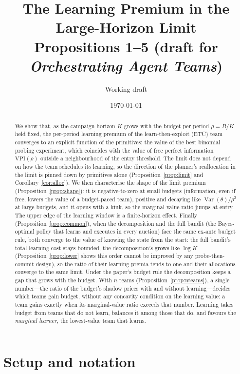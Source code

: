 \documentclass[11pt]{article}
\title{The Learning Premium in the Large-Horizon Limit\\[3pt]
\large Propositions 1--5 (draft for \emph{Orchestrating Agent Teams})}
\author{Working draft}
\date{\today}
\theoremstyle{definition}
\theoremstyle{remark}
\newcommand{\VPI}{\mathrm{VPI}}
\DeclareMathOperator{\Var}{Var}
\begin{document}
\maketitle

\begin{abstract}
We show that, as the campaign horizon $K$ grows with the budget per period $\rho=B/K$ held fixed,
the per-period learning premium of the learn-then-exploit (ETC) team converges to an explicit function
of the primitives: the value of the best binomial probing experiment, which coincides with the value of
free perfect information $\VPI(\rho)$ outside a neighbourhood of the entry threshold. The limit does not depend on
how the team schedules its learning, so the direction of the planner's reallocation in the limit is
pinned down by primitives alone (Proposition~\ref{prop:limit} and Corollary~\ref{cor:alloc}). We then
characterise the shape of the limit premium (Proposition~\ref{prop:shape}): it is negative-to-zero at small
budgets (information, even if free, lowers the value of a budget-paced team), positive and decaying like
$\Var(\theta)/\rho^2$ at large budgets, and it opens with a kink, so the marginal-value ratio jumps at entry.
The upper edge of the learning window is a finite-horizon effect.
Finally (Proposition~\ref{prop:common}), when the decomposition and the full bandit (the Bayes-optimal policy that
learns and executes in every auction) face the same ex-ante budget rule, both converge to the value of knowing the
state from the start: the full bandit's total learning cost stays bounded, the decomposition's grows like $\log K$
(Proposition~\ref{prop:lower} shows this order cannot be improved by any probe-then-commit design), so the ratio of
their learning premia tends to one and their allocations converge to the same limit.
Under the paper's budget rule the decomposition keeps a gap that grows with the budget.
With $n$ teams (Proposition~\ref{prop:nteams}), a single number---the ratio of the budget's shadow prices with and
without learning---decides which teams gain budget, without any concavity condition on the learning value: a team
gains exactly when its marginal-value ratio exceeds that number. Learning takes budget from teams that do not learn,
balances it among those that do, and favours the \emph{marginal learner}, the lowest-value team that learns.
\end{abstract}

\section{Setup and notation}\label{sec:setup}
\end{document}
